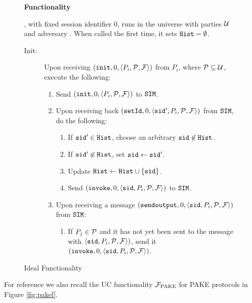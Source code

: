 \begin{figure}[h!]
\begin{mdframed}[innertopmargin=10pt]
\begin{center}
{\bf Functionality \Finit}
\end{center}
\Finit, with fixed session identifier $0$, runs in the universe with parties $\mathcal{U}$ and adversary \SIM.
When called the first time, it sets $\mathtt{Hist}=\emptyset$.

\begin{description}
	
	\item[Init:] Upon receiving $(\mathtt{init}, 0, \langle P_i, \mathcal{P}, \mathcal{F} \rangle)$ from $P_i$, where $\mathcal{P}\subseteq\mathcal{U}$, execute the following:
	  \begin{enumerate}
	    \item Send $(\mathtt{init}, 0, \langle P_i, \mathcal{P}, \mathcal{F} \rangle)$ to $\mathtt{SIM}$.
	    \item Upon receiving back $(\mathtt{setId}, 0, \langle \mathtt{sid}', P_i, \mathcal{P}, \mathcal{F} \rangle)$ from $\mathtt{SIM}$, do the following:
	      \begin{enumerate}
	        \item If $\mathtt{sid}'\in \mathtt{Hist}$, choose an arbitrary $\mathtt{sid}\not\in \mathtt{Hist}$.
	        \item If $\mathtt{sid}'\not\in \mathtt{Hist}$, set $\mathtt{sid}\gets\mathtt{sid}'$.
	        \item Update $\mathtt{Hist} \gets \mathtt{Hist} \cup \{\mathtt{sid}\}$.
	        \item Send $(\mathtt{invoke}, 0, \langle \mathtt{sid}, P_i, \mathcal{P}, \mathcal{F} \rangle)$ to $\mathtt{SIM}$.
	      \end{enumerate}
	    \item Upon receiving a message $(\mathtt{sendoutput}, 0, \langle \mathtt{sid}, P_i, \mathcal{P}, \mathcal{F} \rangle)$ from $\mathtt{SIM}$:
	      \begin{enumerate}
	        \item If $P_j\in\mathcal{P}$ and it has not yet been sent to the \invoke message with $\langle \mathtt{sid}, P_i, \mathcal{P}, \mathcal{F} \rangle)$, send it $(\mathtt{invoke}, 0, \langle \mathtt{sid}, P_i, \mathcal{P}, \mathcal{F} \rangle)$.
	      \end{enumerate}
	  \end{enumerate}
	
\end{description}
\end{mdframed}
\caption{Ideal Functionality \Finit}
\label{fig:initfunctionality}
\end{figure}

\noindent
For reference we also recall the \ac{UC} functionality $\mathcal{F}_{\mathrm{PAKE}}$ for \ac{PAKE} protocols in Figure \ref{fig:pakef}.

